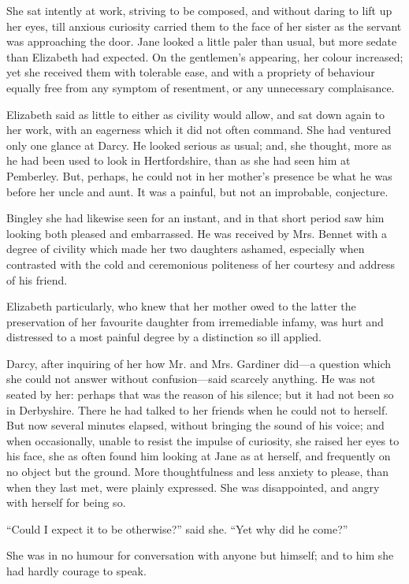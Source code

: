 \documentclass[12pt]{book}
\begin{document}
She sat intently at work, striving to be composed, and without daring to lift up her eyes, till anxious curiosity carried them to the face of her sister as the servant was approaching the door. Jane looked a little paler than usual, but more sedate than Elizabeth had expected. On the gentlemen's appearing, her colour increased; yet she received them with tolerable ease, and with a propriety of behaviour equally free from any symptom of resentment, or any unnecessary complaisance.

Elizabeth said as little to either as civility would allow, and sat down again to her work, with an eagerness which it did not often command. She had ventured only one glance at Darcy. He looked serious as usual; and, she thought, more as he had been used to look in Hertfordshire, than as she had seen him at Pemberley. But, perhaps, he could not in her mother's presence be what he was before her uncle and aunt. It was a painful, but not an improbable, conjecture.

Bingley she had likewise seen for an instant, and in that short period saw him looking both pleased and embarrassed. He was received by Mrs. Bennet with a degree of civility which made her two daughters ashamed, especially when contrasted with the cold and ceremonious politeness of her courtesy and address of his friend.

Elizabeth particularly, who knew that her mother owed to the latter the preservation of her favourite daughter from irremediable infamy, was hurt and distressed to a most painful degree by a distinction so ill applied.

Darcy, after inquiring of her how Mr. and Mrs. Gardiner did---a question which she could not answer without confusion---said scarcely anything. He was not seated by her: perhaps that was the reason of his silence; but it had not been so in Derbyshire. There he had talked to her friends when he could not to herself. But now several minutes elapsed, without bringing the sound of his voice; and when occasionally, unable to resist the impulse of curiosity, she raised her eyes to his face, she as often found him looking at Jane as at herself, and frequently on no object but the ground. More thoughtfulness and less anxiety to please, than when they last met, were plainly expressed. She was disappointed, and angry with herself for being so.

``Could I expect it to be otherwise?'' said she. ``Yet why did he come?''

She was in no humour for conversation with anyone but himself; and to him she had hardly courage to speak.
\end{document}
